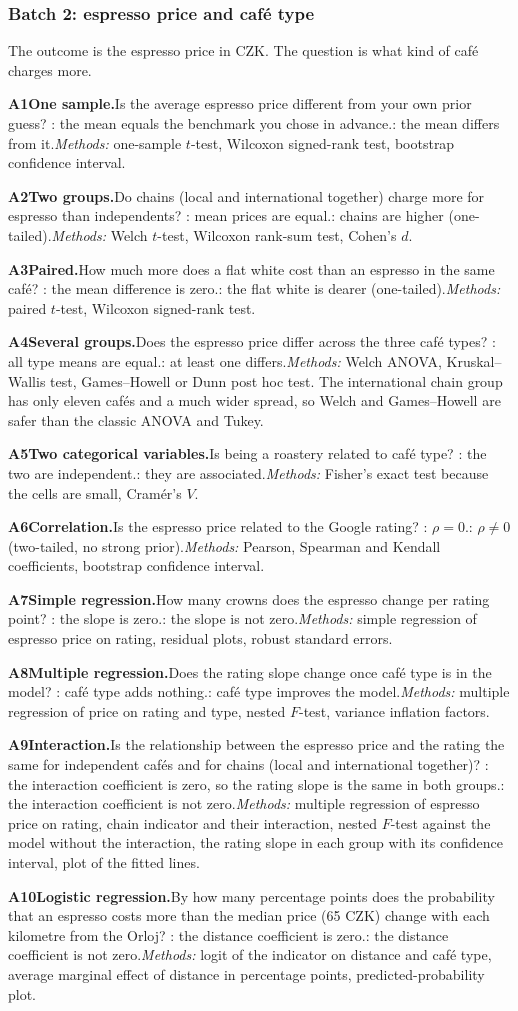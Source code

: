 \documentclass[11pt,a4paper]{article}
\newcommand{\analysis}[6]{%
  \par\smallskip\noindent\textbf{A#1\enspace #2.}\enspace #3\enspace
  \Ho: #4\enspace \Hone: #5\enspace \textit{Methods:} #6\par}
\begin{document}
\clearpage
\subsubsection{Batch 2: espresso price and caf\'e type}

The outcome is the espresso price in CZK. The question is what kind of caf\'e charges more.

\analysis{1}{One sample}{Is the average espresso price different from your own prior guess?}{the mean equals the benchmark you chose in advance.}{the mean differs from it.}{one-sample $t$-test, Wilcoxon signed-rank test, bootstrap confidence interval.}
\analysis{2}{Two groups}{Do chains (local and international together) charge more for espresso than independents?}{mean prices are equal.}{chains are higher (one-tailed).}{Welch $t$-test, Wilcoxon rank-sum test, Cohen's $d$.}
\analysis{3}{Paired}{How much more does a flat white cost than an espresso in the same caf\'e?}{the mean difference is zero.}{the flat white is dearer (one-tailed).}{paired $t$-test, Wilcoxon signed-rank test.}
\analysis{4}{Several groups}{Does the espresso price differ across the three caf\'e types?}{all type means are equal.}{at least one differs.}{Welch ANOVA, Kruskal--Wallis test, Games--Howell or Dunn post hoc test. The international chain group has only eleven caf\'es and a much wider spread, so Welch and Games--Howell are safer than the classic ANOVA and Tukey.}
\analysis{5}{Two categorical variables}{Is being a roastery related to caf\'e type?}{the two are independent.}{they are associated.}{Fisher's exact test because the cells are small, Cram\'er's $V$.}
\analysis{6}{Correlation}{Is the espresso price related to the Google rating?}{$\rho=0$.}{$\rho\neq0$ (two-tailed, no strong prior).}{Pearson, Spearman and Kendall coefficients, bootstrap confidence interval.}
\analysis{7}{Simple regression}{How many crowns does the espresso change per rating point?}{the slope is zero.}{the slope is not zero.}{simple regression of espresso price on rating, residual plots, robust standard errors.}
\analysis{8}{Multiple regression}{Does the rating slope change once caf\'e type is in the model?}{caf\'e type adds nothing.}{caf\'e type improves the model.}{multiple regression of price on rating and type, nested $F$-test, variance inflation factors.}
\analysis{9}{Interaction}{Is the relationship between the espresso price and the rating the same for independent caf\'es and for chains (local and international together)?}{the interaction coefficient is zero, so the rating slope is the same in both groups.}{the interaction coefficient is not zero.}{multiple regression of espresso price on rating, chain indicator and their interaction, nested $F$-test against the model without the interaction, the rating slope in each group with its confidence interval, plot of the fitted lines.}
\analysis{10}{Logistic regression}{By how many percentage points does the probability that an espresso costs more than the median price (65 CZK) change with each kilometre from the Orloj?}{the distance coefficient is zero.}{the distance coefficient is not zero.}{logit of the indicator on distance and caf\'e type, average marginal effect of distance in percentage points, predicted-probability plot.}
\end{document}

